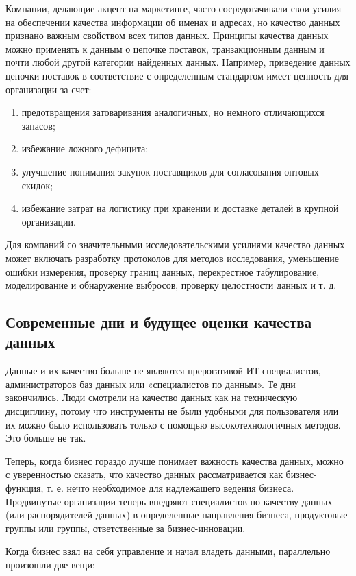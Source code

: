 \documentclass{article}
\begin{document}
Компании, делающие акцент на маркетинге, часто сосредотачивали свои усилия на обеспечении качества информации об именах и адресах, но качество данных признано важным свойством всех типов данных. Принципы качества данных можно применять к данным о цепочке поставок, транзакционным данным и почти любой другой категории найденных данных. Например, приведение данных цепочки поставок в соответствие с определенным стандартом имеет ценность для организации за счет: 

\begin{enumerate}
    \item предотвращения затоваривания аналогичных, но немного отличающихся запасов;
    \item избежание ложного дефицита;
    \item улучшение понимания закупок поставщиков для согласования оптовых скидок;
    \item избежание затрат на логистику при хранении и доставке деталей в крупной организации.
\end{enumerate}

Для компаний со значительными исследовательскими усилиями качество данных может включать разработку протоколов для методов исследования, уменьшение ошибки измерения, проверку границ данных, перекрестное табулирование, моделирование и обнаружение выбросов, проверку целостности данных и т. д.

\subsection{Современные дни и будущее оценки качества данных}

Данные и их качество больше не являются прерогативой ИТ-специалистов, администраторов баз данных или «специалистов по данным». Те дни закончились. Люди смотрели на качество данных как на техническую дисциплину, потому что инструменты не были удобными для пользователя или их можно было использовать только с помощью высокотехнологичных методов. Это больше не так.

Теперь, когда бизнес гораздо лучше понимает важность качества данных, можно с уверенностью сказать, что качество данных рассматривается как бизнес-функция, т. е. нечто необходимое для надлежащего ведения бизнеса. Продвинутые организации теперь внедряют специалистов по качеству данных (или распорядителей данных) в определенные направления бизнеса, продуктовые группы или группы, ответственные за бизнес-инновации.

Когда бизнес взял на себя управление и начал владеть данными, параллельно произошли две вещи:
\end{document}
